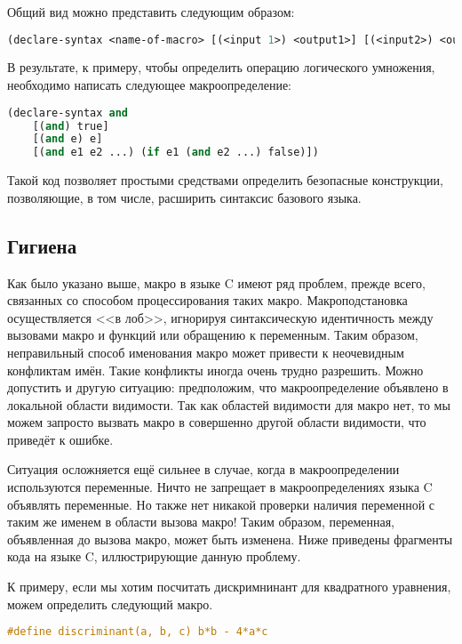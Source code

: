 Общий вид можно представить следующим образом:

\begin{lstlisting}[language=lisp]
(declare-syntax <name-of-macro> [(<input 1>) <output1>] [(<input2>) <output2>] ...)
\end{lstlisting}

В результате, к примеру, чтобы определить операцию логического умножения, необходимо написать следующее макроопределение:

\begin{lstlisting}[language=lisp]
(declare-syntax and
	[(and) true]
	[(and e) e]
	[(and e1 e2 ...) (if e1 (and e2 ...) false)])
\end{lstlisting}

Такой код позволяет простыми средствами определить безопасные конструкции, позволяющие, в том числе, расширить синтаксис базового языка.


\subsection{Гигиена}

Как было указано выше, макро в языке C имеют ряд проблем, прежде всего, связанных со способом процессирования таких макро\cite{Kernighan:1978:CPL:7519}. Макроподстановка осуществляется <<в лоб>>, игнорируя синтаксическую идентичность между вызовами макро и функций или обращению к переменным. Таким образом, неправильный способ именования макро может привести к неочевидным конфликтам имён. Такие конфликты иногда очень трудно разрешить. Можно допустить и другую ситуацию: предположим, что макроопределение объявлено в локальной области видимости. Так как областей видимости для макро нет, то мы можем запросто вызвать макро в совершенно другой области видимости, что приведёт к ошибке.

Ситуация осложняется ещё сильнее в случае, когда в макроопределении используются переменные. Ничто не запрещает в макроопределениях языка C объявлять переменные. Но также нет никакой проверки наличия переменной с таким же именем в области вызова макро! Таким образом, переменная, объявленная до вызова макро, может быть изменена. Ниже приведены фрагменты кода на языке C, иллюстрирующие данную проблему.


К примеру, если мы хотим посчитать дискримнинант для квадратного уравнения, можем определить следующий макро\cite{Clinger:1991:MW:99583.99607}.

\begin{lstlisting}[language=C]
#define discriminant(a, b, c) b*b - 4*a*c
\end{lstlisting}


